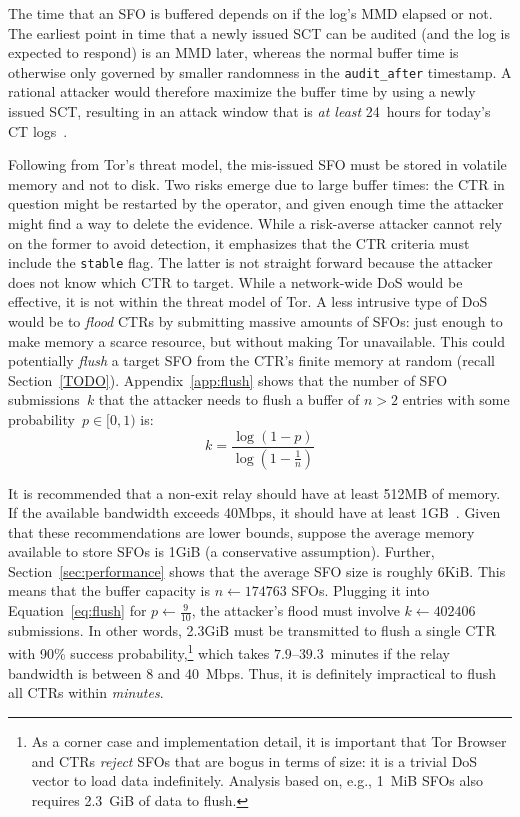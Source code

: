 The time that an SFO is buffered depends on if the log's MMD elapsed or not.
The earliest point in time that a newly issued SCT can be audited (and the log
is expected to respond) is an MMD later, whereas the normal buffer time is
otherwise only governed by smaller randomness in the \texttt{audit\_after}
timestamp.  A rational attacker would therefore maximize the buffer time by
using a newly issued SCT, resulting in an attack window that is \emph{at least}
24~hours for today's CT logs~\cite{google-log-policy}.


Following from Tor's threat model, the mis-issued SFO must be stored in volatile
memory and not to disk.  Two risks emerge due to large buffer times:
	the CTR in question might be restarted by the operator,
	and given enough time the attacker might find a way to delete the evidence.
While a risk-averse attacker cannot rely on the former to avoid detection, it
emphasizes that the CTR criteria must include the \texttt{stable} flag.
The latter is not straight forward because the attacker does not know which CTR
to target.  While a network-wide DoS would be effective, it is not within the
threat model of Tor.  A less intrusive type of DoS would be to \emph{flood} CTRs
by submitting massive amounts of SFOs:
	just enough to make memory a scarce resource, but
	without making Tor unavailable.
This could potentially \emph{flush} a target SFO from the CTR's finite memory
at random (recall Section~\ref{TODO}).  Appendix~\ref{app:flush} shows that the
number of SFO submissions~$k$ that the attacker needs to flush a buffer of $n>2$
entries with some probability~$p\in[0,1)$ is:
\begin{equation} \label{eq:flush}
	k = \frac{\log(1-p)}{\log(1 - \frac{1}{n})}
\end{equation}

It is recommended that a non-exit relay should have at least 512MB of memory.
If the available bandwidth exceeds 40Mbps, it should have at least
1GB~\cite{relay-config}.  Given that these recommendations are lower bounds,
suppose the average memory available to store SFOs is 1GiB (a conservative
assumption).  Further, Section~\ref{sec:performance} shows that the average SFO
size is roughly 6KiB.  This means that the buffer capacity is $n \gets 174763$
SFOs. Plugging it into Equation~\ref{eq:flush} for $p \gets
\frac{9}{10}$, the attacker's flood must involve $k \gets 402406$ submissions.
In other words, 2.3GiB must be transmitted to flush a single CTR with 90\%
success probability,\footnote{%
	As a corner case and implementation detail, it is important that Tor Browser
	and CTRs \emph{reject} SFOs that are bogus in terms of size: it is a trivial
	DoS vector to load data indefinitely. Analysis based on, e.g., 1~MiB SFOs
	also requires 2.3~GiB of data to flush.
} which takes $7.9$--$39.3$~minutes if the relay bandwidth is between 8 and
40~Mbps.  Thus, it is definitely impractical to flush all CTRs within
\emph{minutes}.


